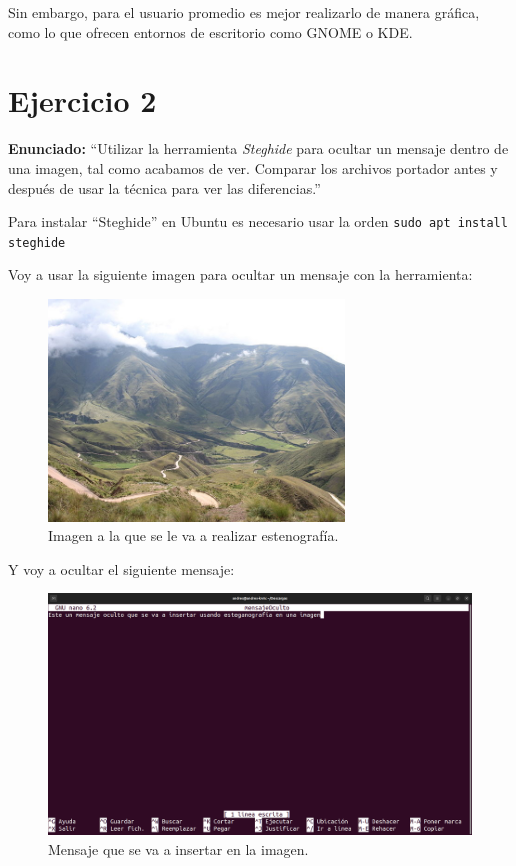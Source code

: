 \documentclass{article}
\begin{document}
Sin embargo, para el usuario promedio es mejor realizarlo de manera gráfica, como lo que ofrecen entornos de escritorio como GNOME o KDE.

\newpage

{}
\section*{Ejercicio 2}

\textbf{Enunciado: }``Utilizar la herramienta \textit{Steghide} para ocultar un mensaje dentro de una imagen, tal como acabamos de ver. Comparar los archivos portador antes y después de usar la técnica para ver las diferencias.''

\bigskip

Para instalar ``Steghide'' en Ubuntu es necesario usar la orden \verb|sudo apt install steghide|

\bigskip

Voy a usar la siguiente imagen para ocultar un mensaje con la herramienta:

\begin{figure}[H]
    \centering
    \includegraphics[width=0.7\textwidth]{imagenes/imagen.jpg}
    \caption{Imagen a la que se le va a realizar estenografía.}
\end{figure}

Y voy a ocultar el siguiente mensaje:

\begin{figure}[H]
    \includegraphics[width=\textwidth]{imagenes/Captura desde 2022-10-30 11-27-46.png}
    \caption{Mensaje que se va a insertar en la imagen.}
\end{figure}
\end{document}
